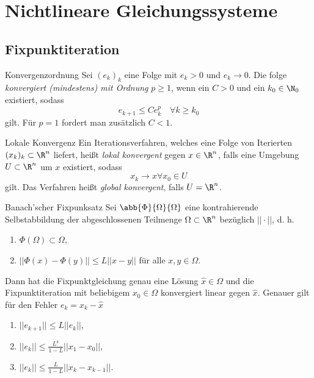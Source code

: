 \setcounter{section}{4}
\section{Nichtlineare Gleichungssysteme}
\subsection{Fixpunktiteration}

\begin{karte}{Konvergenzordnung}
    Sei \( (e_k)_k \) eine Folge 
    mit \(e_k > 0 \) und \(e_k \rightarrow 0\).
    Die folge \textit{konvergiert (mindestens) mit Ordnung } \(p \geq 1\), 
    wenn ein \(C > 0\) und ein \(k_0 \in \N_0\) existiert, sodass 
    \[ e_{k+1} \leq C e_k^p \quad \forall k\geq k_0 \]
    gilt. Für \(p = 1\) fordert man zusätzlich \(C < 1\).
\end{karte}

\begin{karte}{Lokale Konvergenz}
    Ein Iterationsverfahren, welches eine Folge von Iterierten 
    \( (x_k)_k \subset \R^n \) liefert, heißt \textit{lokal konvergent}
    gegen \(x\in \R^n\), falls eine Umgebung \(U \subset \R^n\) um \(x\) 
    existiert, sodass 
    \[ x_k \rightarrow x \forall x_0 \in U \]
    gilt. Das Verfahren heißt \textit{global konvergent}, falls \( U = \R^n \). 
\end{karte}

\begin{karte}{Banach'scher Fixpunksatz}
    Sei \( \abb{\Phi}{\Omega}{\Omega} \) eine kontrahierende 
    Selbstabbildung der abgeschlossenen Teilmenge \( \Omega \subset \R^n \) 
    bezüglich \( || \cdot || \), d. h. 
    \begin{enumerate}
        \item \( \Phi(\Omega) \subset \Omega \),
        \item \( ||\Phi(x) - \Phi(y)|| \leq L ||x-y|| \) für alle \( x,y \in \Omega \).
    \end{enumerate}
    Dann hat die Fixpunktgleichung genau eine Lösung \( \widehat{x} \in \Omega \) 
    und die Fixpunktiteration mit beliebigem \(x_0 \in \Omega\) konvergiert linear gegen \( \widehat{x} \).
    Genauer gilt für den Fehler \( e_k = x_k - \widehat{x} \)
    \begin{enumerate}
        \item \( ||e_{k+1}|| \leq L ||e_k || \),
        \item \( ||e_k|| \leq \frac{L^k}{1-L} ||x_1 - x_0 || \),
        \item \( ||e_k|| \leq \frac{L}{1-L} ||x_k - x_{k-1}|| \).
    \end{enumerate}
\end{karte}

